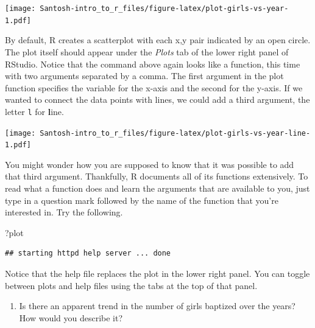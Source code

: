 \documentclass[]{article}
\newenvironment{Shaded}{\begin{snugshade}}{\end{snugshade}}
\newcommand{\KeywordTok}[1]{\textcolor[rgb]{0.13,0.29,0.53}{\textbf{#1}}}
\newcommand{\DataTypeTok}[1]{\textcolor[rgb]{0.13,0.29,0.53}{#1}}
\newcommand{\StringTok}[1]{\textcolor[rgb]{0.31,0.60,0.02}{#1}}
\newcommand{\OperatorTok}[1]{\textcolor[rgb]{0.81,0.36,0.00}{\textbf{#1}}}
\newcommand{\NormalTok}[1]{#1}
\providecommand{\tightlist}{%
  \setlength{\itemsep}{0pt}\setlength{\parskip}{0pt}}
\begin{document}
\texttt{[image: Santosh-intro\_to\_r\_files/figure-latex/plot-girls-vs-year-1.pdf]}

By default, R creates a scatterplot with each x,y pair indicated by an
open circle. The plot itself should appear under the \emph{Plots} tab of
the lower right panel of RStudio. Notice that the command above again
looks like a function, this time with two arguments separated by a
comma. The first argument in the plot function specifies the variable
for the x-axis and the second for the y-axis. If we wanted to connect
the data points with lines, we could add a third argument, the letter
\texttt{l} for \textbf{l}ine.

\begin{Shaded}
\end{Shaded}

\texttt{[image: Santosh-intro\_to\_r\_files/figure-latex/plot-girls-vs-year-line-1.pdf]}

You might wonder how you are supposed to know that it was possible to
add that third argument. Thankfully, R documents all of its functions
extensively. To read what a function does and learn the arguments that
are available to you, just type in a question mark followed by the name
of the function that you're interested in. Try the following.

\begin{Shaded}
\begin{Highlighting}[]
\NormalTok{?plot}
\end{Highlighting}
\end{Shaded}

\begin{verbatim}
## starting httpd help server ... done
\end{verbatim}

Notice that the help file replaces the plot in the lower right panel.
You can toggle between plots and help files using the tabs at the top of
that panel.

\begin{enumerate}
\def\labelenumi{\arabic{enumi}.}
\setcounter{enumi}{1}
\tightlist
\item
  Is there an apparent trend in the number of girls baptized over the
  years?\\
  How would you describe it?
\end{enumerate}
\end{document}
